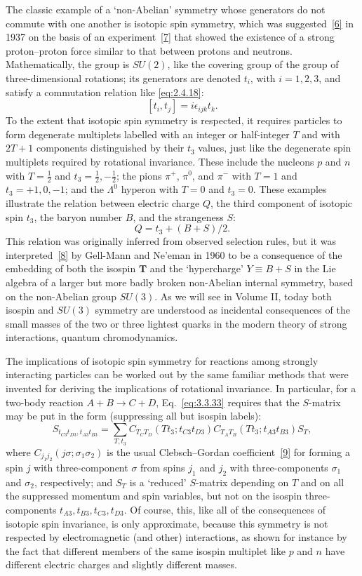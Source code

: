 The classic example of a `non-Abelian' symmetry whose generators do not commute
with one another is isotopic spin symmetry, which was suggested~\hyperref[ref:3.6]{[6]} in 1937 on the
basis of an experiment~\hyperref[ref:3.7]{[7]} that showed the existence of a strong proton--proton
force similar to that between protons and neutrons. Mathematically, the group is
$SU(2)$, like the covering group of the group of three-dimensional rotations; its
generators are denoted $t_i$, with $i=1,2,3$, and satisfy a commutation relation
like \eqref{eq:2.4.18}:
\[
[t_i,t_j]=i\epsilon_{ijk}t_k.
\]
To the extent that isotopic spin symmetry is respected, it requires particles to
form degenerate multiplets labelled with an integer or half-integer $T$ and with
$2T+1$ components distinguished by their $t_3$ values, just like the degenerate
spin multiplets required by rotational invariance. These include the nucleons $p$
and $n$ with $T=\tfrac12$ and $t_3=\tfrac12,-\tfrac12$; the pions $\pi^+$,
$\pi^0$, and $\pi^-$ with $T=1$ and $t_3=+1,0,-1$; and the $\Lambda^0$ hyperon
with $T=0$ and $t_3=0$. These examples illustrate the relation between electric
charge $Q$, the third component of isotopic spin $t_3$, the baryon number $B$, and
the strangeness $S$:
\[
Q=t_3+(B+S)/2.
\]
This relation was originally inferred from observed selection rules, but it was
interpreted~\hyperref[ref:3.8]{[8]} by Gell-Mann and Ne'eman in 1960 to be a consequence of the
embedding of both the isospin $\mathbf{T}$ and the `hypercharge' $Y\equiv B+S$ in
the Lie algebra of a larger but more badly broken non-Abelian internal symmetry,
based on the non-Abelian group $SU(3)$. As we will see in Volume II, today both
isospin and $SU(3)$ symmetry are understood as incidental consequences of the small
masses of the two or three lightest quarks in the modern theory of strong
interactions, quantum chromodynamics.

The implications of isotopic spin symmetry for reactions among strongly interacting
particles can be worked out by the same familiar methods that were invented for
deriving the implications of rotational invariance. In particular, for a two-body
reaction $A+B\to C+D$, Eq.~\eqref{eq:3.3.33} requires that the $S$-matrix may be put in the
form (suppressing all but isospin labels):
\[
S_{t_{C3}t_{D3},t_{A3}t_{B3}}
=\sum_{T,t_3}C_{T_CT_D}(Tt_3;t_{C3}t_{D3})
C_{T_AT_B}(Tt_3;t_{A3}t_{B3})S_T,
\]
where $C_{j_1j_2}(j\sigma;\sigma_1\sigma_2)$ is the usual Clebsch--Gordan
coefficient~\hyperref[ref:3.9]{[9]} for forming a spin $j$ with three-component $\sigma$ from spins
$j_1$ and $j_2$ with three-components $\sigma_1$ and $\sigma_2$, respectively;
and $S_T$ is a `reduced' $S$-matrix depending on $T$ and on all the suppressed
momentum and spin variables, but not on the isospin three-components
$t_{A3},t_{B3},t_{C3},t_{D3}$. Of course, this, like all of the consequences of
isotopic spin invariance, is only approximate, because this symmetry is not
respected by electromagnetic (and other) interactions, as shown for instance by
the fact that different members of the same isospin multiplet like $p$ and $n$
have different electric charges and slightly different masses.
